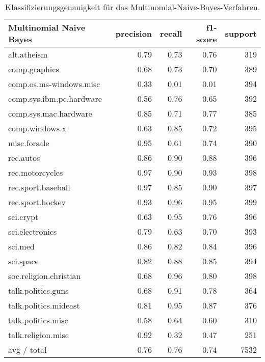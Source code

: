 \begin{table}[h!]
\centering
\begin{tabular}{|l | r | r | r | r|}
\hline
Multinomial Naive Bayes        & precision  &  recall &  f1-score &   support \\
\hline
             alt.atheism       & 0.79      & 0.73      & 0.76      & 319 \\
           comp.graphics       & 0.68      & 0.73      & 0.70      & 389 \\
 comp.os.ms-windows.misc       & 0.33      & 0.01      & 0.01      & 394 \\
comp.sys.ibm.pc.hardware       & 0.56      & 0.76      & 0.65      & 392 \\
   comp.sys.mac.hardware       & 0.85      & 0.71      & 0.77      & 385 \\
          comp.windows.x       & 0.63      & 0.85      & 0.72      & 395 \\
            misc.forsale       & 0.95      & 0.61      & 0.74      & 390 \\
               rec.autos       & 0.86      & 0.90      & 0.88      & 396 \\
         rec.motorcycles       & 0.97      & 0.90      & 0.93      & 398 \\
      rec.sport.baseball       & 0.97      & 0.85      & 0.90      & 397 \\
        rec.sport.hockey       & 0.93      & 0.96      & 0.95      & 399 \\
               sci.crypt       & 0.63      & 0.95      & 0.76      & 396 \\
         sci.electronics       & 0.79      & 0.63      & 0.70      & 393 \\
                 sci.med       & 0.86      & 0.82      & 0.84      & 396 \\
               sci.space       & 0.82      & 0.88      & 0.85      & 394 \\
  soc.religion.christian       & 0.68      & 0.96      & 0.80      & 398 \\
      talk.politics.guns       & 0.68      & 0.91      & 0.78      & 364 \\
   talk.politics.mideast       & 0.81      & 0.95      & 0.87      & 376 \\
      talk.politics.misc       & 0.58      & 0.64      & 0.60      & 310 \\
      talk.religion.misc       & 0.92      & 0.32      & 0.47      & 251 \\
\hline
               avg / total     & 0.76      & 0.76      & 0.74      & 7532 \\
\hline			 
\end{tabular}
\caption{Klassifizierungsgenauigkeit für das Multinomial-Naive-Bayes-Verfahren.}
\label{tab:MNB}
\end{table}
			 
